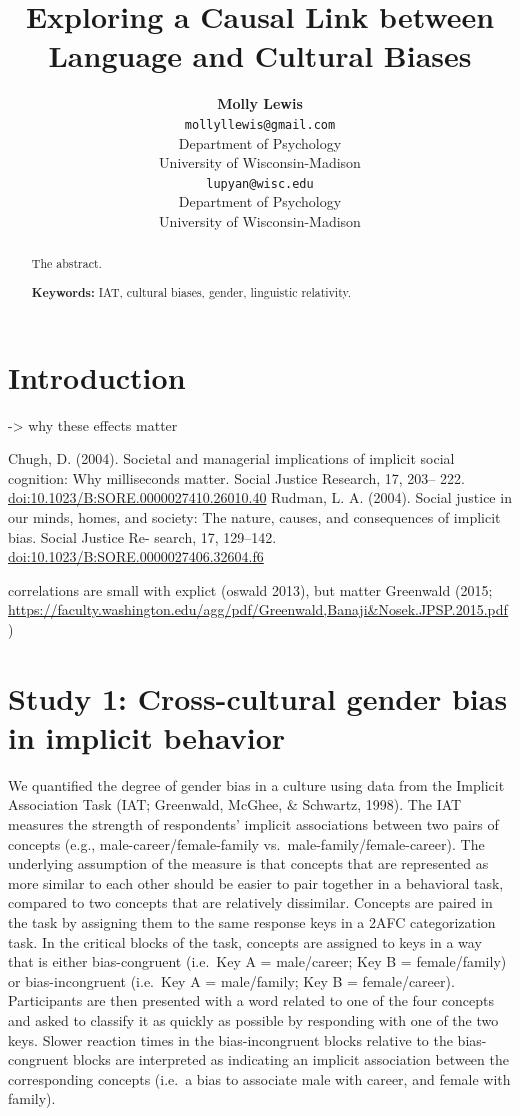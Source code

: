 \documentclass[10pt, letterpaper]{article}
\title{Exploring a Causal Link between Language and Cultural Biases}
\author{{\large \bf Molly Lewis} \\ \texttt{mollyllewis@gmail.com} \\ Department of Psychology  \\ University of Wisconsin-Madison \And {\large \bf Gary Lupyan} \\ \texttt{lupyan@wisc.edu} \\ Department of Psychology  \\ University of Wisconsin-Madison}
\begin{document}
\maketitle

\begin{abstract}
The abstract.

\textbf{Keywords:}
IAT, cultural biases, gender, linguistic relativity.
\end{abstract}

\section{Introduction}\label{introduction}

-\textgreater{} why these effects matter

Chugh, D. (2004). Societal and managerial implications of implicit
social cognition: Why milliseconds matter. Social Justice Research, 17,
203-- 222. \url{doi:10.1023/B:SORE.0000027410.26010.40} Rudman, L. A.
(2004). Social justice in our minds, homes, and society: The nature,
causes, and consequences of implicit bias. Social Justice Re- search,
17, 129--142. \url{doi:10.1023/B:SORE.0000027406.32604.f6}

correlations are small with explict (oswald 2013), but matter Greenwald
(2015;
\url{https://faculty.washington.edu/agg/pdf/Greenwald,Banaji\&Nosek.JPSP.2015.pdf})

\section{Study 1: Cross-cultural gender bias in implicit
behavior}\label{study-1-cross-cultural-gender-bias-in-implicit-behavior}

We quantified the degree of gender bias in a culture using data from the
Implicit Association Task (IAT; Greenwald, McGhee, \& Schwartz, 1998).
The IAT measures the strength of respondents' implicit associations
between two pairs of concepts (e.g., male-career/female-family
vs.~male-family/female-career). The underlying assumption of the measure
is that concepts that are represented as more similar to each other
should be easier to pair together in a behavioral task, compared to two
concepts that are relatively dissimilar. Concepts are paired in the task
by assigning them to the same response keys in a 2AFC categorization
task. In the critical blocks of the task, concepts are assigned to keys
in a way that is either bias-congruent (i.e.~Key A = male/career; Key B
= female/family) or bias-incongruent (i.e.~Key A = male/family; Key B =
female/career). Participants are then presented with a word related to
one of the four concepts and asked to classify it as quickly as possible
by responding with one of the two keys. Slower reaction times in the
bias-incongruent blocks relative to the bias-congruent blocks are
interpreted as indicating an implicit association between the
corresponding concepts (i.e.~a bias to associate male with career, and
female with family).
\end{document}

